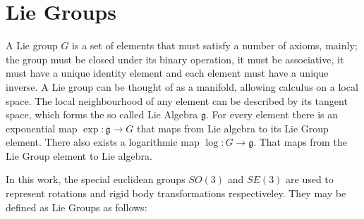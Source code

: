 

\section{Lie Groups}
\label{sec:lie_group}

A Lie group $G$ is a set of elements that must satisfy a number of axioms, mainly; the group must be closed under its binary operation, it must be associative, it must have a unique identity element and each element must have a unique inverse.  A Lie group can be thought of as a manifold, allowing calculus on a local space.  The local neighbourhood of any element can be described by its tangent space, which forms the so called Lie Algebra $\mathfrak g$.  For every element there is an exponential map $\exp\colon \mathfrak g \to G$ that maps from Lie algebra to its Lie Group element.  There also exists a logarithmic map $\log\colon G \to \mathfrak g$.  That maps from the Lie Group element to Lie algebra.

In this work, the special euclidean groups $SO(3)$ and $SE(3)$ are used to represent rotations and rigid body transformations respectiveley.  They may be defined as Lie Groups as follows:
 
